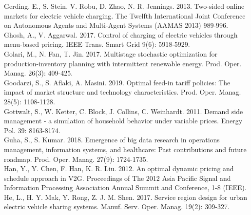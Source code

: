 \documentclass[10pt]{article}
\begin{document}
Gerding, E., S. Stein, V. Robu, D. Zhao, N. R. Jennings. 2013. Two-sided online markets for electric vehicle charging. The Twelfth International Joint Conference on Autonomous Agents and Multi-Agent Systems (AAMAS 2013) 989-996.\\
Ghosh, A., V. Aggarwal. 2017. Control of charging of electric vehicles through menu-based pricing. IEEE Trans. Smart Grid 9(6): 5918-5929.\\
Golari, M., N. Fan, T. Jin. 2017. Multistage stochastic optimization for production-inventory planning with intermittent renewable energy. Prod. Oper. Manag. 26(3): 409-425.\\
Goodarzi, S., S. Aflaki, A. Masini. 2019. Optimal feed-in tariff policies: The impact of market structure and technology characteristics. Prod. Oper. Manag. 28(5): 1108-1128.\\
Gottwalt, S., W. Ketter, C. Block, J. Collins, C. Weinhardt. 2011. Demand side management - a simulation of household behavior under variable prices. Energy Pol. 39: 8163-8174.\\
Guha, S., S. Kumar. 2018. Emergence of big data research in operations management, information systems, and healthcare: Past contributions and future roadmap. Prod. Oper. Manag. 27(9): 1724-1735.\\
Han, Y., Y. Chen, F. Han, K. R. Liu. 2012. An optimal dynamic pricing and schedule approach in V2G. Proceedings of The 2012 Asia Pacific Signal and Information Processing Association Annual Summit and Conference, 1-8 (IEEE).\\
He, L., H. Y. Mak, Y. Rong, Z. J. M. Shen. 2017. Service region design for urban electric vehicle sharing systems. Manuf. Serv. Oper. Manag. 19(2): 309-327.
\end{document}
